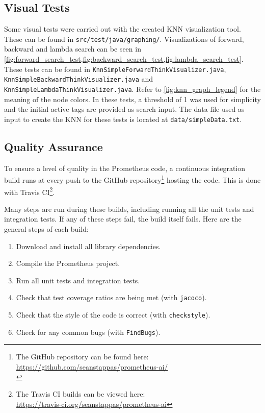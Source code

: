 \documentclass[titlepage,11pt]{article}
\newcommand{\code}[1]{\texttt{#1}}
\begin{document}
\subsection{Visual Tests}
Some visual tests were carried out with the created KNN visualization tool. These can be found in \code{src/test/java/graphing/}. Visualizations of forward, backward and lambda search can be seen in \cref{fig:forward_search_test,fig:backward_search_test,fig:lambda_search_test}. These tests can be found in \code{KnnSimpleForwardThinkVisualizer.java}, \code{KnnSimpleBackwardThinkVisualizer.java} and \code{KnnSimpleLambdaThinkVisualizer.java}. Refer to \cref{fig:knn_graph_legend} for the meaning of the node colors. In these tests, a threshold of 1 was used for simplicity and the initial active tags are provided as search input. The data file used as input to create the KNN for these tests is located at \code{data/simpleData.txt}.

\subsection{Quality Assurance}

To ensure a level of quality in the Prometheus code, a continuous integration build runs at every push to the GitHub repository\footnote{The GitHub repository can be found here:\\ \url{https://github.com/seanstappas/prometheus-ai/}\\} hosting the code. This is done with Travis CI\footnote{The Travis CI builds can be viewed here:\\ \url{https://travis-ci.org/seanstappas/prometheus-ai}}.

Many steps are run during these builds, including running all the unit tests and integration tests. If any of these steps fail, the build itself fails. Here are the general steps of each build:

\begin{enumerate}
	\item Download and install all library dependencies.
	\item Compile the Prometheus project.
	\item Run all unit tests and integration tests.
	\item Check that test coverage ratios are being met (with \code{jacoco}).
	\item Check that the style of the code is correct (with \code{checkstyle}).
	\item Check for any common bugs (with \code{FindBugs}).
\end{enumerate}
\end{document}

